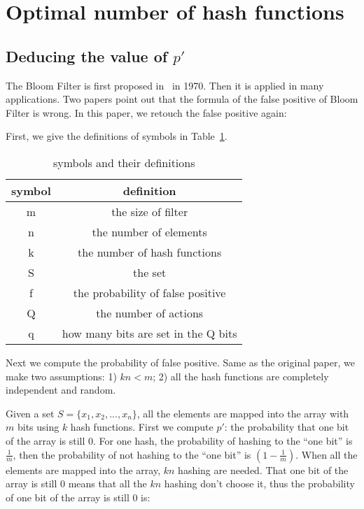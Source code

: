 \section{Optimal number of hash functions}

\subsection{Deducing the value of $p'$}
The Bloom Filter is first proposed in~\cite{BF1970} in 1970. Then it is applied in many applications.  Two papers point out that the formula of the false positive of Bloom Filter is wrong. In this paper, we retouch the false positive again:

First, we give the definitions of symbols in Table~\ref{table:symbols}.

\begin{table} [h]
\caption{symbols and their definitions}
\centering
\label{table:symbols}
\begin{tabular}{c c}
\hline symbol & definition \\ 
\hline m & the size of filter \\ 
 	   n & the number of elements \\ 
       k & the number of hash functions \\ 
       S & the set \\ 
       f & the probability of false positive \\
       Q & the number of actions \\ 
       q & how many bits are set in the Q bits \\ 
\hline 
\end{tabular} 
\end{table}

Next we compute the probability of false positive. Same as the original paper, we make two assumptions: 1) $kn<m$; 2) all the hash functions are completely independent and random.

Given a set $S=\{x_1,x_2,... ,x_n\}$, all the elements are mapped into the array with $m$ bits using $k$ hash functions. First we compute $p'$: the probability that one bit of the array is still 0. For one hash, the probability of hashing to the ``one bit'' is $\frac{1}{m}$, then the probability of not hashing to the ``one bit'' is $(1-\frac{1}{m})$. When all the elements are mapped into the array, $kn$ hashing are needed. That one bit of the array is still 0 means that all the $kn$ hashing don't choose it, thus the probability of one bit of the array is still 0 is:

